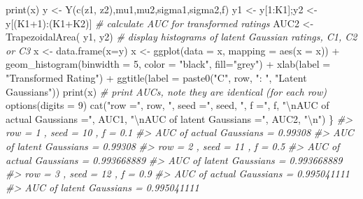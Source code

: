 \documentclass[
]{book}
\newenvironment{Shaded}{\begin{snugshade}}{\end{snugshade}}
\newcommand{\AttributeTok}[1]{\textcolor[rgb]{0.77,0.63,0.00}{#1}}
\newcommand{\CommentTok}[1]{\textcolor[rgb]{0.56,0.35,0.01}{\textit{#1}}}
\newcommand{\DecValTok}[1]{\textcolor[rgb]{0.00,0.00,0.81}{#1}}
\newcommand{\FunctionTok}[1]{\textcolor[rgb]{0.00,0.00,0.00}{#1}}
\newcommand{\NormalTok}[1]{#1}
\newcommand{\OtherTok}[1]{\textcolor[rgb]{0.56,0.35,0.01}{#1}}
\newcommand{\SpecialCharTok}[1]{\textcolor[rgb]{0.00,0.00,0.00}{#1}}
\newcommand{\StringTok}[1]{\textcolor[rgb]{0.31,0.60,0.02}{#1}}
\begin{document}
\begin{Shaded}
\begin{Highlighting}[]
  \FunctionTok{print}\NormalTok{(x)}
\NormalTok{  y }\OtherTok{\textless{}{-}} \FunctionTok{Y}\NormalTok{(}\FunctionTok{c}\NormalTok{(z1, z2),mu1,mu2,sigma1,sigma2,f)}
\NormalTok{  y1 }\OtherTok{\textless{}{-}}\NormalTok{ y[}\DecValTok{1}\SpecialCharTok{:}\NormalTok{K1];y2 }\OtherTok{\textless{}{-}}\NormalTok{ y[(K1}\SpecialCharTok{+}\DecValTok{1}\NormalTok{)}\SpecialCharTok{:}\NormalTok{(K1}\SpecialCharTok{+}\NormalTok{K2)]}
  \CommentTok{\# calculate AUC for transformed ratings}
\NormalTok{  AUC2 }\OtherTok{\textless{}{-}} \FunctionTok{TrapezoidalArea}\NormalTok{( y1, y2)}
  \CommentTok{\# display histograms of latent Gaussian ratings, C1, C2 or C3}
\NormalTok{  x }\OtherTok{\textless{}{-}} \FunctionTok{data.frame}\NormalTok{(}\AttributeTok{x=}\NormalTok{y)}
\NormalTok{  x }\OtherTok{\textless{}{-}}  \FunctionTok{ggplot}\NormalTok{(}\AttributeTok{data =}\NormalTok{ x, }\AttributeTok{mapping =} \FunctionTok{aes}\NormalTok{(}\AttributeTok{x =}\NormalTok{ x)) }\SpecialCharTok{+}
    \FunctionTok{geom\_histogram}\NormalTok{(}\AttributeTok{binwidth =} \DecValTok{5}\NormalTok{, }\AttributeTok{color =} \StringTok{"black"}\NormalTok{, }\AttributeTok{fill=}\StringTok{"grey"}\NormalTok{) }\SpecialCharTok{+}
    \FunctionTok{xlab}\NormalTok{(}\AttributeTok{label =} \StringTok{"Transformed Rating"}\NormalTok{) }\SpecialCharTok{+} 
    \FunctionTok{ggtitle}\NormalTok{(}\AttributeTok{label =} \FunctionTok{paste0}\NormalTok{(}\StringTok{"C"}\NormalTok{, row, }\StringTok{": "}\NormalTok{, }\StringTok{"Latent Gaussians"}\NormalTok{))}
  \FunctionTok{print}\NormalTok{(x)}
\CommentTok{\# print AUCs, note they are identical (for each row)  }
\FunctionTok{options}\NormalTok{(}\AttributeTok{digits =} \DecValTok{9}\NormalTok{)}
  \FunctionTok{cat}\NormalTok{(}\StringTok{"row ="}\NormalTok{, row, }\StringTok{", seed ="}\NormalTok{, seed, }\StringTok{", f ="}\NormalTok{, f, }
      \StringTok{"}\SpecialCharTok{\textbackslash{}n}\StringTok{AUC of actual Gaussians ="}\NormalTok{, AUC1, }
      \StringTok{"}\SpecialCharTok{\textbackslash{}n}\StringTok{AUC of latent Gaussians ="}\NormalTok{, AUC2, }\StringTok{"}\SpecialCharTok{\textbackslash{}n}\StringTok{"}\NormalTok{)}
\NormalTok{\}}
\CommentTok{\#\textgreater{} row = 1 , seed = 10 , f = 0.1 }
\CommentTok{\#\textgreater{} AUC of actual Gaussians = 0.99308 }
\CommentTok{\#\textgreater{} AUC of latent Gaussians = 0.99308}
\CommentTok{\#\textgreater{} row = 2 , seed = 11 , f = 0.5 }
\CommentTok{\#\textgreater{} AUC of actual Gaussians = 0.993668889 }
\CommentTok{\#\textgreater{} AUC of latent Gaussians = 0.993668889}
\CommentTok{\#\textgreater{} row = 3 , seed = 12 , f = 0.9 }
\CommentTok{\#\textgreater{} AUC of actual Gaussians = 0.995041111 }
\CommentTok{\#\textgreater{} AUC of latent Gaussians = 0.995041111}
\end{Highlighting}
\end{Shaded}
\end{document}
